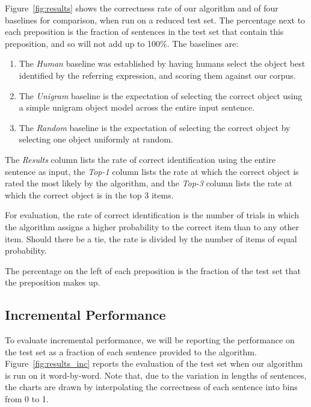 \documentclass[letterpaper,10pt]{article}
\begin{document}
Figure~\ref{fig:results} shows the correctness rate of our algorithm and of four baselines for comparison, when run on a reduced test set. The percentage next to each preposition is the fraction of sentences in the test set that contain this preposition, and so will not add up to 100\%. The baselines are:
\begin{enumerate}[topsep=0pt,itemsep=-1ex,partopsep=1ex,parsep=1ex]
	\item The \emph{Human} baseline was established by having humans select the object best identified by the referring expression, and scoring them against our corpus.
	\item The \emph{Unigram} baseline is the expectation of selecting the correct object using a simple unigram object model across the entire input sentence.
	\item The \emph{Random} baseline is the expectation of selecting the correct object by selecting one object uniformly at random.
\end{enumerate}

The \emph{Results} column lists the rate of correct identification using the entire sentence as input, the \emph{Top-1} column lists the rate at which the correct object is rated the most likely by the algorithm, and the \emph{Top-3} column lists the rate at which the correct object is in the top 3 items.

For evaluation, the rate of correct identification is the number of trials in which the algorithm assigns a higher probability to the correct item than to any other item. Should there be a tie, the rate is divided by the number of items of equal probability.

The percentage on the left of each preposition is the fraction of the test set that the preposition makes up.

\subsection{Incremental Performance}

To evaluate incremental performance, we will be reporting the performance on the test set as a fraction of each sentence provided to the algorithm. Figure~\ref{fig:results_inc} reports the evaluation of the test set when our algorithm is run on it word-by-word. Note that, due to the variation in lengths of sentences, the charts are drawn by interpolating the correctness of each sentence into bins from 0 to 1.
\end{document}
